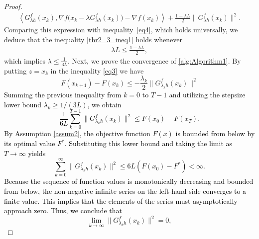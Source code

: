 \documentclass[10pt,a4paper]{amsart}
\begin{document}
\begin{proof}
{\begin{align}
    \left\langle G^{f}_{\lambda h}(x_k),
    \nabla f\bigl(x_k - \lambda G^{f}_{\lambda h}(x_k)\bigr) - \nabla f(x_k)
    \right\rangle
    + \frac{1 - \lambda L}{2}\|G^{f}_{\lambda h}(x_k)\|^2.
\end{align}
Comparing this expression with inequality~\eqref{eq4}, which holds universally, we deduce that the inequality \eqref{thr2_3_ineq1} holds whenever
\begin{align}\label{thr2_3_ineq2}
    \lambda L \leq \frac{1 - \lambda L}{2},
\end{align}
which implies $\lambda \leq \frac{1}{3L}$.}
Next, we prove the convergence of \ref{alg:Algorithm1}. By putting $z = x_k$ in the inequality \ref{eq3} we have
\begin{equation}\label{conv-analysis}
F(x_{k+1}) - F(x_k) \leq - \dfrac{\lambda_k}{2} \|G^{f}_{\lambda_k h}(x_k)\|^2  
\end{equation}
\textcolor{black}{Summing the previous inequality from $k=0$ to $T-1$ and utilizing the stepsize lower bound $\lambda_k \geq 1/(3L)$, we obtain
\begin{equation*}
\frac{1}{6L}\sum_{k=0}^{T-1} \|G^{f}_{\lambda_k h}(x_k)\|^2 \leq F(x_0) - F(x_{T}).
\end{equation*}
By Assumption \ref{assum2}, the objective function $F(x)$ is bounded from below by its optimal value $F^*$. Substituting this lower bound and taking the limit as $T \to \infty$ yields
\begin{equation*}
\sum_{k=0}^\infty \|G^{f}_{\lambda_k h}(x_k)\|^2 \leq 6L (F(x_0) - F^*) < \infty.
\end{equation*}
Because the sequence of function values is monotonically decreasing and bounded from below, the non-negative infinite series on the left-hand side converges to a finite value. This implies that the elements of the series must asymptotically approach zero. Thus, we conclude that
\begin{equation*}
\lim_{k \to \infty} \|G^{f}_{\lambda_k h}(x_k)\|^2 = 0,

\end{equation*}}
\end{proof}
\end{document}
